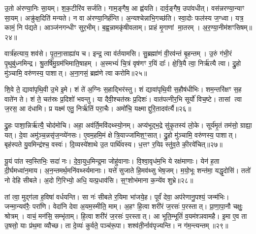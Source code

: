 उ॒तो अ॑रण्या॒निः सा॒यम्।
श॒क॒टीरि॑व सर्जति।
गाम॒ङ्गैष॒ आ ह्व॑यति।
दार्व॒ङ्गैष॒ उपा॑वधीत्।
वस॑न्नरण्या॒न्याꣳ सा॒यम्।
अक्रु॑क्ष॒दिति॑ मन्यते।
न वा अ॑रण्या॒निर्\mbox{}ह॑न्ति।
अ॒न्यश्चेन्नाभि॒गच्छ॑ति।
स्वा॒दोः फल॑स्य ज॒ग्ध्वा।
यत्र॒ कामं॒ नि प॑द्यते।
आञ्ज॑नगन्धीꣳ सुर॒भीम्।
ब॒ह्व॒न्नामकृ॑षीवलाम्।
प्राहं मृ॒गाणां मा॒तरम्।
अ॒र॒ण्या॒नीम॑शꣳसिषम्॥२४॥\anuvakamend[स्या॒म॒ रु॒रो॒ह॒ यु॒वा॒नः॒ शु॒न्ध्यूरि॒च्छमा॑नो दृश्यते॒ निप॑द्यते च॒त्वारि॑ च]

वार्त्र॑हत्याय॒ शव॑से।
पृ॒त॒ना॒साह्या॑य च।
इन्द्र॒ त्वा व॑र्तयामसि।
सु॒ब्रह्मा॑णं वी॒रव॑न्तं बृ॒हन्तम्।
उ॒रुं ग॑भी॒रं पृ॒थुबु॑ध्नमिन्द्र।
श्रु॒तर्\mbox{}षि॑मु॒ग्रम॑भिमाति॒षाहम्।
अ॒स्मभ्यं॑ चि॒त्रं वृष॑णꣳ र॒यिं दाः᳚।
क्षे॒त्रि॒यै त्वा॒ निर्\mbox{}ऋ॑त्यै त्वा।
द्रु॒हो मु॑ञ्चामि॒ वरु॑णस्य॒ पाशात्।
अ॒ना॒गसं॒ ब्रह्म॑णे त्वा करोमि॥२५॥

शि॒वे ते॒ द्यावा॑पृथि॒वी उ॒भे इ॒मे।
शं ते॑ अ॒ग्निः स॒हाद्भिर॑स्तु।
शं द्यावा॑पृथि॒वी स॒हौष॑धीभिः।
शम॒न्तरि॑क्षꣳ स॒ह वाते॑न ते।
शं ते॒ चत॑स्रः प्र॒दिशो॑ भवन्तु।
या दैवी॒श्चत॑स्रः प्र॒दिशः॑।
वात॑पत्नीर॒भि सूर्यो॑ विच॒ष्टे।
तासां त्वा ज॒रस॒ आ द॑धामि।
प्र यक्ष्म॑ एतु॒ निर्\mbox{}ऋ॑तिं परा॒चैः।
अमो॑चि॒ यक्ष्माद्दुरि॒तादव॑र्त्यै॥२६॥

द्रु॒हः पाशा॒न्निर्\mbox{}ऋ॑त्यै॒ चोद॑मोचि।
अहा॒ अव॑र्ति॒मवि॑दथ्स्यो॒नम्।
अप्य॑भूद्भ॒द्रे सु॑कृ॒तस्य॑ लो॒के।
सूर्य॑मृ॒तं तम॑सो॒ ग्राह्या॒ यत्।
दे॒वा अमु॑ञ्च॒न्नसृ॑ज॒न्व्ये॑नसः।
ए॒वम॒हमि॒मं क्षेत्रि॒याज्जा॑मिश॒ꣳ॒सात्।
द्रु॒हो मु॑ञ्चामि॒ वरु॑णस्य॒ पाशात्।
बृह॑स्पते यु॒वमिन्द्र॑श्च॒ वस्वः॑।
दि॒व्यस्ये॑शाथे उ॒त पार्थि॑वस्य।
ध॒त्तꣳ र॒यिꣴ स्तु॑व॒ते की॒रये॑चित्॥२७॥

यू॒यं पा॑त स्व॒स्तिभिः॒ सदा॑ नः।
दे॒वा॒युध॒मिन्द्र॒मा जोहु॑वानाः।
वि॒श्वा॒वृध॑म॒भि ये रक्ष॑माणाः।
येन॑ ह॒ता दी॒र्घमध्वा॑न॒माय\sn{}।
अ॒न॒न्तमर्थ॒मनि॑वर्थ्स्यमानाः।
यत्ते॑ सुजाते हि॒मव॑थ्सु भेष॒जम्।
म॒यो॒भूः शन्त॑मा॒ यद्धृ॒दोसि॑।
ततो॑ नो देहि सीबले।
अ॒दो गि॒रिभ्यो॒ अधि॒ यत्प्र॒धाव॑सि।
स॒ꣳ॒शोभ॑माना क॒न्ये॑व शुभ्रे॥२८॥

तां त्वा॒ मुद्ग॑ला ह॒विषा॑ वर्धयन्ति।
सा नः॑ सीबले र॒यिमा भा॑जये॒ह।
पूर्वं॑ देवा॒ अप॑रेणानु॒पश्यं॒ जन्म॑भिः।
जन्मा॒न्यव॑रैः॒ परा॑णि।
वेदा॑नि देवा अ॒यम॒स्मीति॒ माम्।
अ॒हꣳ हि॒त्वा शरी॑रं ज॒रसः॑ प॒रस्तात्।
प्रा॒णा॒पा॒नौ चक्षुः॒ श्रोत्रम्।
वाचं॒ मन॑सि॒ सम्भृ॑ताम्।
हि॒त्वा शरी॑रं ज॒रसः॑ प॒रस्तात्।
आ भूति॒म्भूतिं॑ व॒यम॑श्ञवामहै।
इ॒मा ए॒व ता उ॒षसो॒ याः प्र॑थ॒मा व्यौच्छ\sn{}।
ता दे॒व्यः॑ कुर्वते॒ पञ्च॑रू॒पा।
शश्व॑ती॒र्नाव॑पृज्यन्ति।
न ग॑म॒न्त्यन्तम्॥२९॥\anuvakamend[क॒रो॒म्यव॑र्त्यै चिच्छुभ्रे\-ऽश्ञवामहै च॒त्वारि॑ च]

